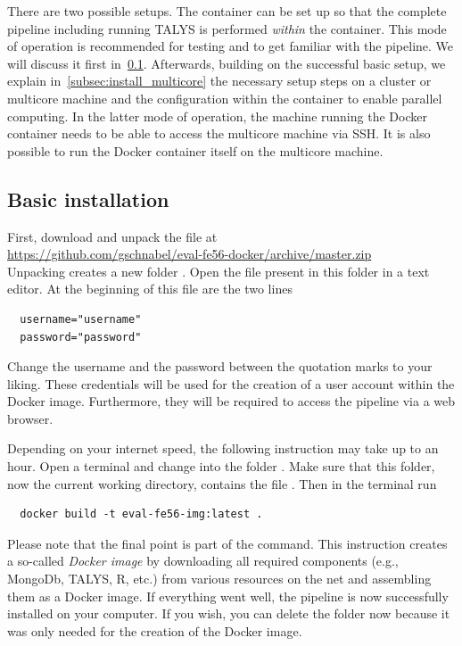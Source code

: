 \documentclass[12pt,a4paper]{scrartcl}
\begin{document}
There are two possible setups.
The container can be set up so that the complete pipeline including running TALYS is performed \textit{within} the container. This mode of operation is recommended for testing and to get familiar with the pipeline. We will discuss it first in~\cref{subsec:install_basic}.
Afterwards, building on the successful basic setup, we explain in~\cref{subsec:install_multicore} the necessary setup steps on a cluster or multicore machine and the configuration within the container to enable parallel computing.
In the latter mode of operation, the machine running the Docker container needs to be able to access the multicore machine via SSH.
It is also possible to run the Docker container itself on the multicore machine.

 \subsection{Basic installation}
 \label{subsec:install_basic}
  
 First, download and unpack the file at
 \\[2ex]
 \indent\url{https://github.com/gschnabel/eval-fe56-docker/archive/master.zip}
 \\[2ex]
 \noindent 
 Unpacking creates a new folder .
 Open the file  present in this folder in a text editor. At the beginning of this file are the two lines
\begin{verbatim}
  username="username"
  password="password"
\end{verbatim}
Change the username and the password between the quotation marks to your liking.
 These credentials will be used for the creation of a user account within the Docker image.
 Furthermore, they will be required to access the pipeline via a web browser.
 
 Depending on your internet speed, the following instruction may take up to an hour.
 Open a terminal and change into the folder .
 Make sure that this folder, now the current working directory, contains the file .
Then in the terminal run
\begin{verbatim}
  docker build -t eval-fe56-img:latest . 
\end{verbatim}
 Please note that the final point is part of the command.
 This instruction creates a so-called \textit{Docker image} by downloading all required components (e.g., MongoDb, TALYS, R, etc.) from various resources on the net and assembling them as a Docker image.
 If everything went well, the pipeline is now successfully installed on your computer.
 If you wish, you can delete the folder  now because it was only needed for the creation of the Docker image.
\end{document}
